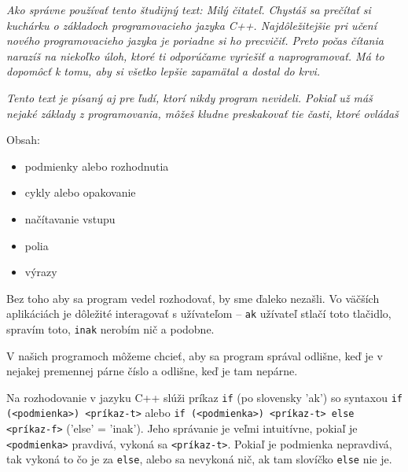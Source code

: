 




\textit{Ako správne používať tento študijný text: Milý čitateľ. Chystáš sa
prečítať si kuchárku o základoch programovacieho jazyka C++. Najdôležitejšie
pri učení nového programovacieho jazyka je poriadne si ho precvičiť. Preto
počas čítania narazíš na niekoľko úloh, ktoré ti odporúčame vyriešiť a
naprogramovať.  Má to dopomôcť k tomu, aby si všetko lepšie zapamätal a dostal
do krvi.}

\textit{Tento text je písaný aj pre ľudí, ktorí nikdy program nevideli. Pokiaľ
už máš nejaké základy z programovania, môžeš kludne preskakovať tie časti,
ktoré ovládaš}

Obsah:
\begin{itemize}
    \item podmienky alebo rozhodnutia
    \item cykly alebo opakovanie 
    \item načítavanie vstupu
    \item polia
    \item výrazy
\end{itemize}

\medskip


Bez toho aby sa program vedel rozhodovať, by sme ďaleko nezašli. Vo väčších
aplikáciách je dôležité interagovať s užívateľom -- \verb!ak! užívateľ stlačí
toto tlačidlo, spravím toto, \verb!inak!  nerobím nič a podobne. 

V našich programoch môžeme chcieť, aby sa program správal odlišne, keď je v
nejakej premennej párne číslo a odlišne, keď je tam nepárne.

Na rozhodovanie v jazyku C++ slúži príkaz \verb!if! (po slovensky 'ak') so
syntaxou \verb!if (<podmienka>) <príkaz-t>! alebo \verb!if (<podmienka>) <príkaz-t> else <príkaz-f>!
('else' = 'inak'). Jeho správanie je veľmi intuitívne, pokiaľ je
\verb!<podmienka>! pravdivá, vykoná sa \verb!<príkaz-t>!.  Pokiaľ je podmienka
nepravdivá, tak vykoná to čo je za \verb!else!, alebo sa nevykoná nič, ak tam
slovíčko \verb!else! nie je.

